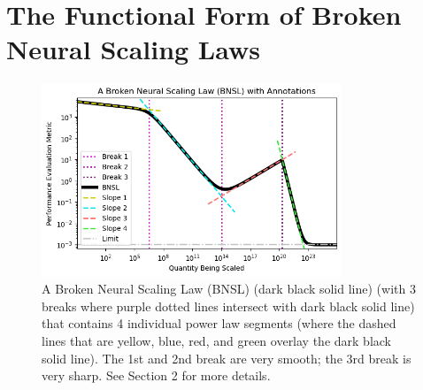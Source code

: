 \documentclass{article} %
\begin{document}
%
\vspace{-2.6mm}
\section{The Functional Form of Broken Neural Scaling Laws }
\label{section:bnsl}
\vspace{-4.4mm}

\begin{figure}[h]%
    \centering


\hspace*{-.04cm}\includegraphics[width=0.80\textwidth]{figures/figure_1/figure_1__wide.png}
\vspace{-4.1mm}

    \caption{A Broken Neural Scaling Law (BNSL) (dark black solid line) (with 3 breaks where purple dotted lines intersect with dark black solid line) that contains 4 individual power law segments (where the dashed lines that are yellow, blue, red, and green overlay the dark black solid line). The 1st and 2nd break are very smooth; the 3rd break is very sharp. See Section 2 for more details.}
    \label{fig:figure_1}
\end{figure}
\end{document}
